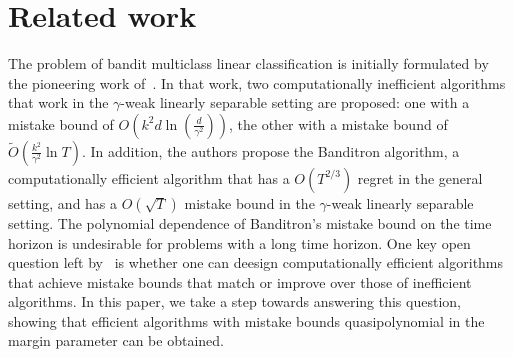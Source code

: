 \documentclass[12pt]{article}
\begin{document}
\section{Related work}
\label{section:related-work}
The problem of bandit multiclass linear classification is initially formulated
 by the pioneering work of~\cite{Kakade-Shalev-Shwartz-Tewari-2008}. In that work,
 two computationally
 inefficient algorithms that work in the $\gamma$-weak linearly separable setting are proposed: one with a mistake bound of
 $O(k^2 d \ln(\frac{d}{\gamma^2}))$, the other with a mistake bound of $\tilde{O}(\frac{k^2}{\gamma^2} \ln T)$.
 In addition, the authors propose the Banditron algorithm, a computationally efficient
 algorithm that has a $O(T^{2/3})$ regret in the general setting, and has a
 $O(\sqrt{T})$ mistake bound in the $\gamma$-weak linearly separable setting.
The polynomial dependence of Banditron's mistake bound on the time horizon is undesirable
for problems with a long time horizon.
 One key open question left by~\cite{Kakade-Shalev-Shwartz-Tewari-2008} is whether
 one can deesign computationally efficient algorithms that achieve mistake bounds that match or improve over those of inefficient algorithms.
 In this paper, we take a step towards answering this question, showing that
 efficient algorithms with mistake bounds quasipolynomial in the margin parameter can be obtained.

\end{document}
